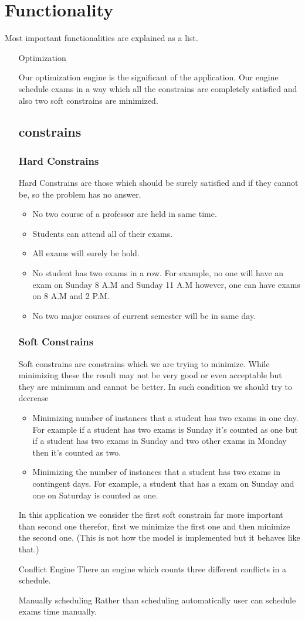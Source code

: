 \documentclass{report}
\begin{document}
\section{Functionality}
Most important functionalities are explained as a list.
\begin{itemize}
	\item[Optimization] {Our optimization engine is the significant of the application. Our engine schedule exams in a way which all the constrains are completely satisfied and also two soft constrains are minimized.
		\subsection{constrains}
		\subsubsection{Hard Constrains}
			Hard Constrains are those which should be surely satisfied and if they cannot be, so the problem has no answer.
			\begin{itemize}
				\item{No two course of a professor are held in same time.}
				\item{Students can attend all of their exams.}
				\item{All exams will surely be hold.}
				\item{No student has two exams in a row. For example, no one will have an exam on Sunday 8 A.M and Sunday 11 A.M however, one can have exams on 8 A.M and 2 P.M.}
				\item{No two major courses of current semester will be in same day.}
			\end{itemize}
		\subsubsection{Soft Constrains}
			Soft constrains are constrains which we are trying to minimize. While minimizing these the result may not be very good or even acceptable but they are minimum and cannot be better. In such condition we should try to decrease 
			\begin{itemize}
				\item{Minimizing number of instances that a student has two exams in one day. For example if a student has two exams is Sunday it's counted as one but if a student has two exams in Sunday and two other exams in Monday then it's counted as two.}
				\item{Minimizing the number of instances that a student has two exams in contingent days. For example, a student that has a exam on Sunday and one on Saturday is counted as one.}
			\end{itemize}
			In this application we consider the first soft constrain far more important than second one therefor, first we minimize the first one and then minimize the second one. (This is not how the model is implemented but it behaves like that.)
		}
	\item[Conflict Engine] {There an engine which counts three different conflicts in a schedule. }
	\item[Manually scheduling] {Rather than scheduling automatically user can schedule exams time manually.}
\end{itemize}
\end{document}
